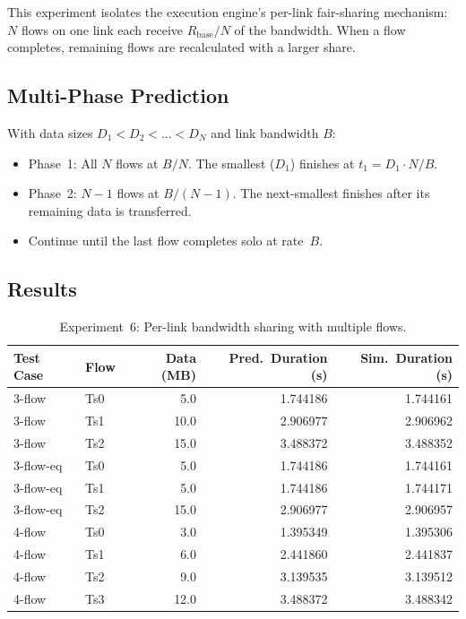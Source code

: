 \documentclass[11pt,a4paper]{article}
\begin{document}
This experiment isolates the execution engine's per-link fair-sharing mechanism: $N$ flows on one link each receive $R_{\text{base}}/N$ of the bandwidth. When a flow completes, remaining flows are recalculated with a larger share.

\subsection{Multi-Phase Prediction}
With data sizes $D_1 < D_2 < \ldots < D_N$ and link bandwidth $B$:
\begin{itemize}    \item Phase~1: All $N$ flows at $B/N$. The smallest ($D_1$) finishes at $t_1 = D_1 \cdot N / B$.
    \item Phase~2: $N{-}1$ flows at $B/(N{-}1)$. The next-smallest finishes after its remaining data is transferred.
    \item Continue until the last flow completes solo at rate~$B$.
\end{itemize}

\subsection{Results}

\begin{table}[h]
\centering
\caption{Experiment~6: Per-link bandwidth sharing with multiple flows.}
\label{tab:exp6}
\begin{tabular}{llrrr}
\toprule
Test Case & Flow & Data (MB) & Pred.\ Duration (s) & Sim.\ Duration (s) \\
\midrule
3-flow & Ts0 &  5.0 & 1.744186 & 1.744161 \\
3-flow & Ts1 & 10.0 & 2.906977 & 2.906962 \\
3-flow & Ts2 & 15.0 & 3.488372 & 3.488352 \\
\midrule
3-flow-eq & Ts0 &  5.0 & 1.744186 & 1.744161 \\
3-flow-eq & Ts1 &  5.0 & 1.744186 & 1.744171 \\
3-flow-eq & Ts2 & 15.0 & 2.906977 & 2.906957 \\
\midrule
4-flow & Ts0 &  3.0 & 1.395349 & 1.395306 \\
4-flow & Ts1 &  6.0 & 2.441860 & 2.441837 \\
4-flow & Ts2 &  9.0 & 3.139535 & 3.139512 \\
4-flow & Ts3 & 12.0 & 3.488372 & 3.488342 \\
\bottomrule
\end{tabular}
\end{table}
\end{document}
